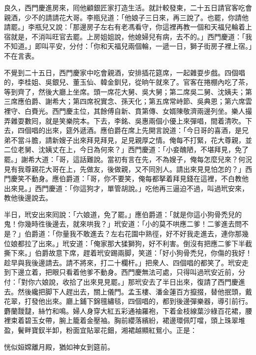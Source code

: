 良久，西門慶進房來，囘他顧銀匠家打造生活。就計較發柬，二十五日請官客吃會親酒，少不的請請花大哥。李瓶兒道：「他娘子三日來，再三說了。也罷，你請他請罷。」李瓶兒又說：「那邊房子左右有老馮看守，你這裡再教一個和天福兒輪着上宿就是，不消叫旺官去罷。上房姐姐說，他媳婦兒有病，去不的。」{}西門慶道：「我不知道。」即叫平安，分付：「你和天福兒兩個輪，一遞一日，獅子街房子裡上宿。」不在言表。

不覺到二十五日，西門慶家中吃會親酒，安排插花筵席，一起雜耍步戲。四個唱的，李桂姐、吳銀兒、董玉仙、韓金釧兒，從晌午就來了。官客在捲棚內吃了茶，等到齊了，然後大廳上坐席。頭一席花大舅、吳大舅；第二席吳二舅、沈姨夫；第三席應伯爵、謝希大；第四席祝實念、孫天化；第五席常峙節、吳典恩；第六席雲裡守、白賚光。西門慶主位，其餘傅自新、賁第傳、女婿陳敬濟兩邊列坐。樂人撮弄雜耍數囘，就是笑樂院本。下去，李銘、吳惠兩個小優上來彈唱，間着清吹。下去，四個唱的出來，筵外遞酒。應伯爵在席上先開言說道：「今日哥的喜酒，是兄弟不當斗膽，請新嫂子出來拜見拜見，足見親厚之情。俺每不打緊，花大尊親，並二位老舅、沈姨丈在上，今日為何來？」西門慶道：「小妾醜陋，不堪拜見，免了罷。」謝希大道：「哥，這話難說。當初有言在先，不為嫂子，俺每怎麼兒來？何況見有我尊親花大哥在上，先做友，後做親，又不同別人。請出來見見怕怎的？」西門慶笑不動身。應伯爵道：「哥，你不要笑，俺每都拏着拜見錢在這裡，不白教他出來見。」西門慶道：「你這狗才，單管胡說。」吃他再三逼迫不過，叫過玳安來，教他後邊說去。

半日，玳安出來囘說：「六娘道，免了罷。」應伯爵道：「就是你這小狗骨禿兒的鬼！你幾時徃後邊去，就來哄我？」玳安道：「小的莫不哄應二爹！二爹進去問不是？」伯爵道：「你量我不敢進去？左右花園中熟徑，好不好我走進去，連你那幾位娘都拉了出來。」玳安道：「俺家那大猱獅狗，好不利害。倒沒有把應二爹下半截撕下來。」伯爵故意下席，趕着玳安踢兩脚，笑道：「好小狗骨禿兒，你傷的我好！趁早與我後邊請去。請不將來，打二十欄杆。」把衆人、四個唱的都笑了。玳安走到下邊立着，把眼只看着他爹不動身。西門慶無法可處，只得叫過玳安近前，分付：「對你六娘說，收拾了出來見見罷。」那玳安去了半日出來，復請了西門慶進去。然後纔把脚下人趕出去，關上儀門。孟玉樓、潘金蓮百方攛掇，替他抿頭，戴花翠，打發他出來。廳上鋪下錦氊繡毯，四個唱的，都到後邊彈樂器，導引前行。麝蘭靉靆，絲竹和鳴。婦人身穿大紅五彩通袖羅袍，下着金枝線葉沙綠百花裙，腰裡束着碧玉女帶，腕上籠着金壓袖。胸前纓落繽紛，裙邊環佩叮噹，頭上珠翠堆盈，鬢畔寶釵半卸，粉面宜貼翠花鈿，湘裙越顯紅鴛小。正是：

\begin{myquote} 
恍似姮嫦離月殿，猶如神女到筵前。
\end{myquote} 

